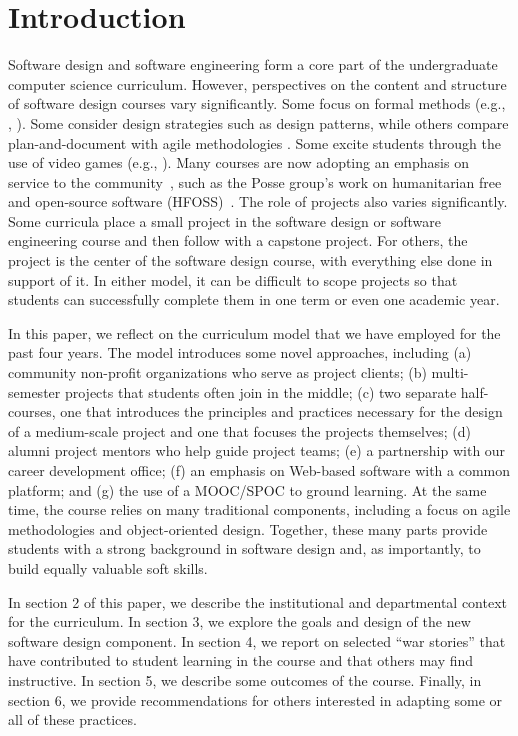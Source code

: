 
\section{Introduction}

Software design and software engineering form a core part of
the undergraduate computer science curriculum. However, perspectives
on the content and structure of software design courses vary
significantly.  Some focus on formal methods (e.g., \cite{liu-2009},
\cite{garcia-2014}).  Some consider design strategies such as design
patterns, while others compare plan-and-document with agile
methodologies \cite{gestwicki-2018}.  Some excite students through
the use of video games (e.g., \cite{wolz-2007}).  Many courses are
now adopting an emphasis on service to the community~\cite{hfoss-2018},
such as the Posse group's work on humanitarian free and open-source
software (HFOSS)~\cite{posse-2018}.
The role of projects also varies significantly.  Some curricula
place a small project in the software design or software engineering
course and then follow with a capstone project.  For others, the
project is the center of the software design course, with everything
else done in support of it. In either model, it can be difficult
to scope projects so that students can successfully complete them
in one term or even one academic year.

In this paper, we reflect on the curriculum model that we have
employed for the past four years.  The model introduces some novel
approaches, including (a) community non-profit organizations who
serve as project clients; (b) multi-semester projects that students
often join in the middle; (c) two separate half-courses, one that
introduces the principles and practices necessary for the design
of a medium-scale project and one that focuses the projects themselves;
(d) alumni project mentors who help guide project teams; (e) a
partnership with our career development office; (f) an emphasis on
Web-based software with a common platform; and (g) the use of a
MOOC/SPOC to ground learning.  At the same time, the course relies
on many traditional components, including a focus on agile methodologies
and object-oriented design.  Together, these many parts provide
students with a strong background in software design and, as
importantly, to build equally valuable soft skills.

In section 2 of this paper, we describe the institutional and
departmental context for the curriculum.  In section 3, we explore
the goals and design of the new software design component.  In
section 4, we report on selected ``war stories'' that have contributed
to student learning in the course and that others may find instructive.
In section 5, we describe some outcomes of the course.  Finally,
in section 6, we provide recommendations for others interested in
adapting some or all of these practices.


